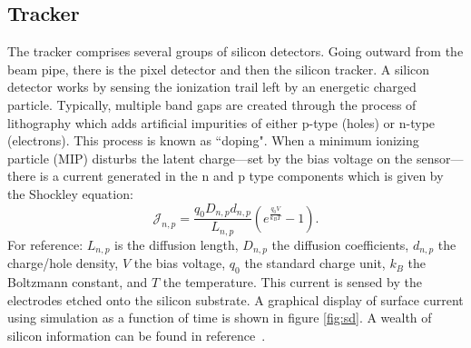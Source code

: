 \subsection{Tracker}

The tracker comprises several groups of silicon detectors. 
Going outward from the beam pipe, there is the pixel detector and then the silicon tracker.
A silicon detector works by sensing the ionization trail left by an energetic charged particle.
Typically, multiple band gaps are created through the process of lithography which adds artificial impurities of either p-type (holes) or n-type (electrons). This process is known as ``doping". When a minimum ionizing particle (MIP) disturbs the latent charge---set by the bias voltage on the sensor---there is a current generated in the n and p type components which is given by the Shockley equation:
\begin{equation}
\label{eq:shockley}
\mathcal{J}_{n,p} = \frac{q_0 D_{n,p} d_{n,p}}{L_{n,p}}\left(e^{\frac{q_0 V}{k_B T}} - 1 \right) \text{.}
\end{equation}
For reference: $L_{n,p}$ is the diffusion length, $D_{n,p}$ the diffusion coefficients, $d_{n,p}$ the charge/hole density, $V$ the bias voltage, $q_0$ the standard charge unit, $k_B$ the Boltzmann constant, and $T$ the temperature. 
This current is sensed by the electrodes etched onto the silicon substrate. 
A graphical display of surface current using simulation as a function of time is shown in figure \ref{fig:sd}. A wealth of silicon information can be found in reference~\cite{Eichhorn:2112017}.

